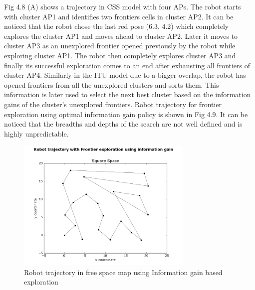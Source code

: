 \par Fig 4.8 (A) shows a trajectory in CSS model with four APs. The robot starts with cluster AP1 and identifies two frontiers cells in cluster AP2. It can be noticed that the robot chose the last red pose (6.3, 4.2) which completely explores the cluster AP1 and moves ahead to cluster AP2. Later it moves to cluster AP3 as an unexplored frontier opened previously by the robot while exploring cluster AP1. The robot then completely explores cluster AP3 and finally its successful exploration comes to an end after exhausting all frontiers of cluster AP4. Similarly in the ITU model due to a bigger overlap, the robot has opened frontiers from all the unexplored clusters and sorts them. This information is later used to select the next best cluster based on the information gains of the cluster's unexplored frontiers. Robot trajectory for frontier exploration using optimal information gain policy is shown in Fig 4.9. It can be noticed that the breadths and depths of the search are not well defined and is highly unpredictable.

\begin{figure}[!b]
    \centering
    \includegraphics[width=0.75\textwidth]{images/infosquare.png}
    \caption{Robot trajectory in free space map using Information gain based exploration}
    \label{fig:info}
\end{figure}


